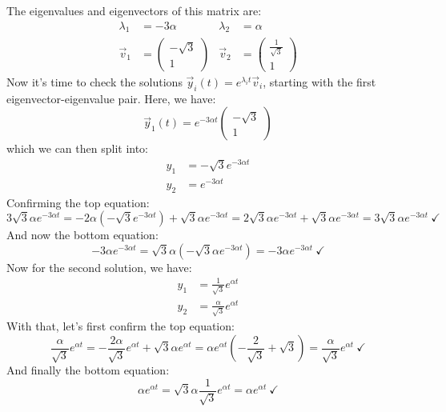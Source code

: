 \documentclass{article}
\begin{document}
\begin{solution}
	The eigenvalues and eigenvectors of this matrix are:
	\begin{align*}
		\lambda_1 &= -3\alpha & \lambda_2 &= \alpha\\
		\vec v_1 &= \begin{pmatrix} -\sqrt{3} \\ 1 \end{pmatrix} & \vec v_2 &= \begin{pmatrix} \frac{1}{\sqrt{3} } \\ 1 \end{pmatrix} 
	\end{align*}
	Now it's time to check the solutions $\vec y_i(t) = e^{\lambda_i t} \vec v_i$, starting with the first 
	eigenvector-eigenvalue pair. Here, we have:
	\[
		\vec y_1(t) = e^{-3 \alpha t}\begin{pmatrix} -\sqrt{3} \\1 \end{pmatrix} 
	\] 
	which we can then split into:
	\begin{align*}
		y_1 &= -\sqrt{3} e^{-3 \alpha t} \\
		y_2 &= e^{-3 \alpha t} 
	\end{align*}
	Confirming the top equation:
	\[
		3\sqrt{3} \alpha e^{-3 \alpha t} = -2\alpha(-\sqrt{3} e^{-3 \alpha t}) + \sqrt{3} \alpha e^{-3 \alpha t} 
		= 2\sqrt{3} \alpha e^{-3 \alpha t} + \sqrt{3} \alpha e^{-3 \alpha t} = 3\sqrt{3} \alpha e^{-3 \alpha t} \
		\checkmark
	\] 
	And now the bottom equation:
	\[
		-3 \alpha e^{-3 \alpha t} = \sqrt{3} \alpha (-\sqrt{3} \alpha e^{-3 \alpha t}) =
		-3 \alpha e^{-3 \alpha t}
		\ \checkmark 
	\] 
	Now for the second solution, we have:
	\begin{align*}
		y_1 &= \frac{1}{\sqrt{3} }e^{\alpha t} \\
		y_2 &= \frac{\alpha}{\sqrt{3} }e^{\alpha t}
	\end{align*}
	With that, let's first confirm the top equation:
	\[
		\frac{\alpha}{\sqrt{3} }e^{\alpha t} = -\frac{2\alpha}{\sqrt{3} }e^{\alpha t} +
		\sqrt{3} \alpha e^{\alpha t} =\alpha  e^{\alpha t} \left(-\frac{2}{\sqrt{3} } +
		\sqrt{3}\right) = \frac{\alpha}{\sqrt{3} }e^{\alpha t}  \ \checkmark
	\] 
	And finally the bottom equation:
	\[
		\alpha e^{\alpha t} = \sqrt{3} \alpha \frac{1}{\sqrt{3} }e^{\alpha t} = \alpha e^{\alpha t} \ \checkmark
	\] 
\end{solution}
\bigskip
\dphline
\pagebreak
\end{document}
